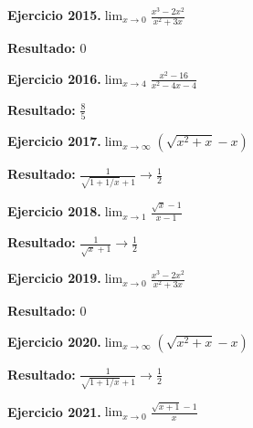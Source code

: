 \documentclass[10pt,a4paper]{article}
\begin{document}
\newpage
\begin{ejbox}
\textbf{Ejercicio 2015.}\quad $\lim_{x\to 0} \frac{x^3-2x^2}{x^2+3x}$
\end{ejbox}

\begin{solbox}
\textbf{Resultado:} \(\displaystyle 0\)
\end{solbox}

\begin{ejbox}
\textbf{Ejercicio 2016.}\quad $\lim_{x\to 4} \frac{x^2-16}{x^2-4x-4}$
\end{ejbox}

\begin{solbox}
\textbf{Resultado:} \(\displaystyle \frac{8}{5}\)
\end{solbox}

\begin{ejbox}
\textbf{Ejercicio 2017.}\quad $\lim_{x\to \infty} (\sqrt{x^2+x} - x)$
\end{ejbox}

\begin{solbox}
\textbf{Resultado:} \(\displaystyle \frac{1}{\sqrt{1+1/x}+1} \to \frac{1}{2}\)
\end{solbox}

\newpage
\begin{ejbox}
\textbf{Ejercicio 2018.}\quad $\lim_{x\to 1} \frac{\sqrt{x}-1}{x-1}$
\end{ejbox}

\begin{solbox}
\textbf{Resultado:} \(\displaystyle \frac{1}{\sqrt{x}+1} \to \frac{1}{2}\)
\end{solbox}

\begin{ejbox}
\textbf{Ejercicio 2019.}\quad $\lim_{x\to 0} \frac{x^3-2x^2}{x^2+3x}$
\end{ejbox}

\begin{solbox}
\textbf{Resultado:} \(\displaystyle 0\)
\end{solbox}

\begin{ejbox}
\textbf{Ejercicio 2020.}\quad $\lim_{x\to \infty} (\sqrt{x^2+x} - x)$
\end{ejbox}

\begin{solbox}
\textbf{Resultado:} \(\displaystyle \frac{1}{\sqrt{1+1/x}+1} \to \frac{1}{2}\)
\end{solbox}

\newpage
\begin{ejbox}
\textbf{Ejercicio 2021.}\quad $\lim_{x\to 0} \frac{\sqrt{x+1}-1}{x}$
\end{ejbox}
\end{document}
